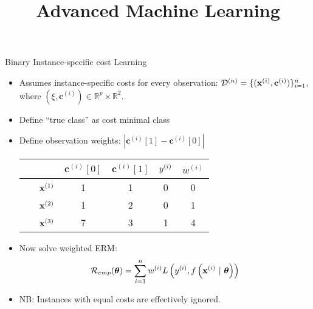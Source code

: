 \documentclass[11pt,compress,t,notes=noshow, xcolor=table]{beamer}
\title{Advanced Machine Learning}
\date{}
\newcommand{\cv}{\mathbf{c}}
\begin{document}



\sloppy





\begin{vbframe}{Binary Instance-specific cost Learning}
    \begin{itemize}
        \item Assumes instance-specific costs for every observation:  $\D^{(n)} = \{(\xi, \cv^{(i)})\}_{i=1}^n$, where $(\xi, \cv^{(i)}) \in \mathbb{R}^p \times \mathbb{R}^2$.

        \item Define ``true class'' as cost minimal class
        
        \item Define observation weights: $|\cv^{(i)}[1] - \cv^{(i)}[0]|$

        \begin{center}
            \begin{tabular}{cc|cccc}\
        			& & $\cv^{(i)}[0]$ & $\cv^{(i)}[1]$ & $y^{(i)}$ & $w^{(i)}$ \\
        			\hline & $\mathbf{x}^{(1)}$ & 1 & 1 & 0 & 0\\
        			& $\mathbf{x}^{(2)}$ & 1 & 2 & 0 & 1\\
        			& $\mathbf{x}^{(3)}$ & 7 & 3 & 1 & 4\\
            \end{tabular}
        \end{center}

        \item Now solve weighted ERM:
        \begin{equation*}
            \mathcal{R}_{emp}(\boldsymbol{\theta}) = \sum_{i=1}^{n}w^{(i)} L\left(y^{(i)}, f\left(\mathbf{x}^{(i)} ~|~ \bm{\theta}\right)\right)
        \end{equation*}
        
        \item NB: Instances with equal costs are effectively ignored.
        \end{itemize}
            
\end{vbframe}
\end{document}
